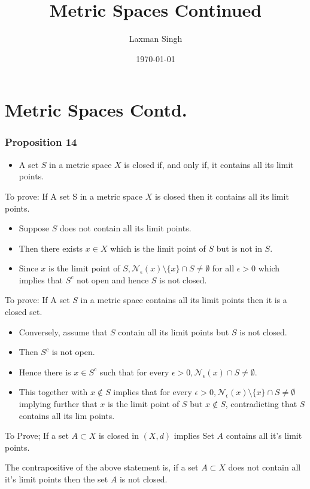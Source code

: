 \documentclass[12pt,a4paper]{article}
\author{Laxman Singh}
\date{\today}
\title{Metric Spaces Continued}
\begin{document}
   \section{Metric Spaces Contd.} 
   \subsubsection{ Proposition 14} 
\begin{itemize}
    \item A set \(S\) in a metric space \(X\) is closed if, and only if, it contains all its limit points.
\end{itemize}
To prove: If A set S in a metric space \(X\) is closed then it contains all its limit points.
\begin{itemize}   
    \item Suppose \(S\) does not contain all its limit points.
    \item Then there exists \(x \in X\) which is the limit point of \(S\) but is not in \(S\).
    \item Since \(x\) is the limit point of \(S, \mathcal{N}_\epsilon(x)\setminus\{x\} \cap S \neq \emptyset\) for all \(\epsilon>0\) which implies that \(S^c\) not open and hence \(S\) is not closed.
\end{itemize}  
To prove: If A set \(S\) in a metric space contains all its limit points then it is a closed set.
\begin{itemize}
    \item Conversely, assume that \(S\) contain all its limit points but \(S\) is not closed.
    \item Then \(S^c\) is not open.
    \item Hence there is \(x \in S^c\) such that for every \(\epsilon>0, \mathcal{N}_\epsilon(x) \cap S \neq \emptyset\).
    \item This together with \(x \notin S\) implies that for every \(\epsilon>0, \mathcal{N}_\epsilon(x) \setminus \{x\} \cap S \neq \emptyset\) implying further that \(x\) is the limit point of \(S\) but \(x \notin S\), contradicting that \(S\) contains all its lim points.
\end{itemize}

To Prove; If a set \(A \subset X\) is closed in \((X,d)\) implies Set \(A\) contains all it's limit points.

The contrapositive of the above statement is, if a set \(A \subset X\) does not contain all it's limit points then the set \(A\) is not closed.       
\end{document}
